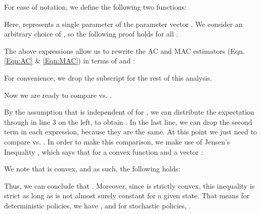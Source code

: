 \documentclass[letterpaper]{article}
\begin{document}
{For ease of notation, we define the following two functions:


Here,  represents a single parameter of the parameter vector . We consider an arbitrary choice of , so the following proof holds for all .

The above expressions allow us to rewrite the AC and MAC estimators (Eqn. \ref{Eqn:AC} \& \ref{Eqn:MAC}) in terms of  and :


For convenience, we drop the  subscript for the rest of this analysis.

Now we are ready to compare  vs. .
\small

\normalsize

By the assumption that  is independent of  for , we can distribute the expectation through  in line 3 on the left, to obtain . In the last line, we can drop the second term in each expression, because they are the same. At this point we just need to compare  vs. . In order to make this comparison, we make use of Jensen's Inequality \cite{jensen1906fonctions}, which says that for a convex function  and a vector :


We note that  is convex, and as such, the following holds:


Thus, we can conclude that . Moreover, since  is strictly convex, this inequality is strict as long as  is not almost surely constant for a given state. That means for deterministic policies, we have , and for stochastic policies, .

}
\end{document}
